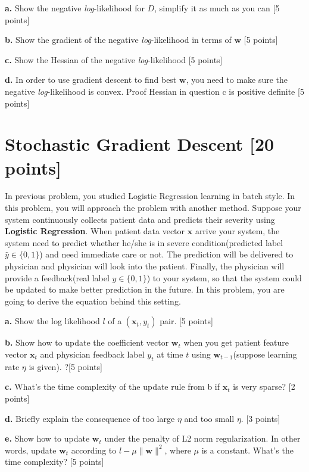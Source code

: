\documentclass[12pt]{article}
\begin{document}
\textbf{a.} Show the negative \textit{log}-likelihood for $D$, simplify it as much as you can [5 points]

\textbf{b.} Show the gradient of the negative \textit{log}-likelihood in terms of $\mathbf{w}$ [5 points]

\textbf{c.} Show the Hessian of the negative \textit{log}-likelihood [5 points]

\textbf{d.} In order to use gradient descent to find best $\mathbf{w}$, you need to make sure the negative \textit{log}-likelihood is convex. Proof Hessian in question c is positive definite [5 points]

\section{Stochastic Gradient Descent [20 points]}
In previous problem, you studied Logistic Regression learning in batch style. In this problem, you will approach the problem with another method. Suppose your system continuously collects patient data and predicts their severity using \textbf{Logistic Regression}. When patient data vector $\mathbf{x}$ arrive your system, the system need to predict whether he/she is in severe condition(predicted label $\hat{y} \in \{0, 1\}$) and need immediate care or not. The prediction will be delivered to physician and physician will look into the patient. Finally, the physician will provide a feedback(real label $y \in \{0, 1\}$) to your system, so that the system could be updated to make better prediction in the future. In this problem, you are going to derive the equation behind this setting.

\textbf{a.} Show the log likelihood $l$ of a $(\mathbf{x}_t, y_t)$ pair. [5 points]

\textbf{b.} Show how to update the coefficient vector $\mathbf{w}_t$ when you get  patient feature vector $\mathbf{x}_t$ and physician feedback label $y_t$ at time $t$ using $\mathbf{w}_{t-1}$(suppose learning rate $\eta$ is given). ?[5 points]

\textbf{c.} What's the time complexity of the update rule from b if $\mathbf{x}_t$ is very sparse? [2 points]

\textbf{d.} Briefly explain the consequence of too large $\eta$ and too small $\eta$. [3 points]

\textbf{e.} Show how to update $\mathbf{w}_t$ under the penalty of L2 norm regularization. In other words, update $\mathbf{w}_t$ according to $l - \mu \|\mathbf{w}\|^2 $, where $\mu$ is a constant. What's the time complexity? [5 points]
\end{document}
